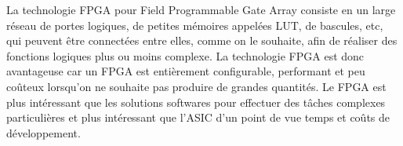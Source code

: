 \documentclass[a4paper,12pt]{article}
\begin{document}
    
    La technologie FPGA pour Field Programmable Gate Array consiste en un large réseau de portes logiques, de petites mémoires appelées LUT, de bascules, etc, qui peuvent être connectées entre elles, comme on le souhaite, afin de réaliser des fonctions logiques plus ou moins complexe. La technologie FPGA est donc avantageuse car un FPGA est entièrement configurable, performant et peu coûteux lorsqu'on ne souhaite pas produire de grandes quantités. Le FPGA est plus intéressant que les solutions softwares pour effectuer des tâches complexes particulières et plus intéressant que l'ASIC d'un point de vue temps et coûts de développement.\newline 
    
\end{document}
